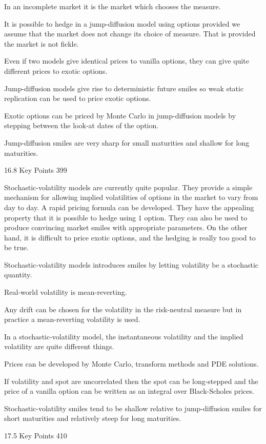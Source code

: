 In an incomplete market it is the market which chooses the measure.

It is possible to hedge in a jump-diffusion model using options provided we assume that the market does not change its choice of measure. That is provided the market is not fickle.

Even if two models give identical prices to vanilla options, they can give quite different prices to exotic options.

Jump-diffusion models give rise to deterministic future smiles so weak static replication can be used to price exotic options.

Exotic options can be priced by Monte Carlo in jump-diffusion models by stepping between the look-at dates of the option.

Jump-diffusion smiles are very sharp for small maturities and shallow for long maturities.

16.8 Key Points 399

Stochastic-volatility models are currently quite popular. They provide a simple mechanism for allowing implied volatilities of options in the market to vary from day to day. A rapid pricing formula can be developed. They have the appealing property that it is possible to hedge using $1$ option. They can also be used to produce convincing market smiles with appropriate parameters. On the other hand, it is difficult to price exotic options, and the hedging is really too good to be true.

Stochastic-volatility models introduces smiles by letting volatility be a stochastic quantity.

Real-world volatility is mean-reverting.

Any drift can be chosen for the volatility in the risk-neutral measure but in practice a mean-reverting volatility is used.

In a stochastic-volatility model, the instantaneous volatility and the implied volatility are quite different things.

Prices can be developed by Monte Carlo, transform methods and PDE solutions.

If volatility and spot are uncorrelated then the spot can be long-stepped and the price of a vanilla option can be written as an integral over Black-Scholes prices.

Stochastic-volatility smiles tend to be shallow relative to jump-diffusion smiles for short maturities and relatively steep for long maturities.

17.5 Key Points 410

